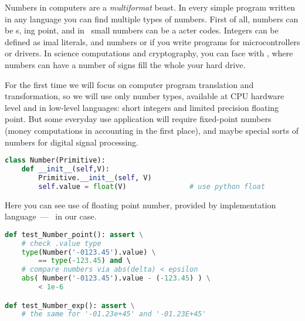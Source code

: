 \clearpage{}

Numbers in computers are a \emph{multiformat} beast. In every simple program
written in any language you can find multiple types of numbers. First of all,
numbers can be s, ing point, and in \cpp\ small
numbers can be a acter codes. Integers can be defined as
imal literals, and  numbers or  if you
write programs for microcontrollers or drivers. In science computations and
cryptography, you can face with , where
numbers can have a number of signs fill the whole your hard drive.

For the first time we will focus on computer program translation and
transformation, so we will use only number types, available at CPU hardware
level and in low-level languages: short integers and limited precision floating
point. But some everyday use application will require fixed-point numbers (money
computations in accounting in the first place), and maybe special sorts of
numbers for digital signal processing.

\begin{lstlisting}[language=Python]
class Number(Primitive):
	def __init__(self,V):
		Primitive.__init__(self, V)
		self.value = float(V)				# use python float
\end{lstlisting}

\noindent
Here you can see use of floating point number, provided by implementation
language\ --- \py\ in our case.

\clearpage
\begin{lstlisting}[language=Python]
def test_Number_point(): assert \
	# check .value type
	type(Number('-0123.45').value) \
		== type(-123.45) and \			
	# compare numbers via abs(delta) < epsilon
	abs( Number('-0123.45').value - (-123.45) ) \
		< 1e-6

def test_Number_exp(): assert \
	# the same for '-01.23e+45' and '-01.23E+45' 
\end{lstlisting}

